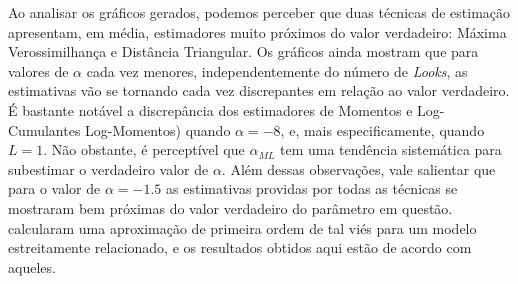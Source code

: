 \documentclass[12pt]{article}
\begin{document}
Ao analisar os gráficos gerados, podemos perceber que duas técnicas de estimação apresentam, em média, estimadores muito próximos do valor verdadeiro: Máxima Verossimilhança e Distância Triangular. Os gráficos ainda mostram que para valores de $\alpha$ cada vez menores, independentemente do número de \textit{Looks}, as estimativas vão se tornando cada vez discrepantes em relação ao valor verdadeiro. É bastante notável a discrepância dos estimadores de Momentos e Log-Cumulantes Log-Momentos) quando $\alpha = -8$, e, mais especificamente, quando $L = 1$. Não obstante, é perceptível que $\alpha_{ML}$ tem uma tendência sistemática para subestimar o verdadeiro valor de $\alpha$. Além dessas observações, vale salientar que para o valor de $\alpha = -1.5$ as estimativas providas por todas as técnicas se mostraram bem próximas do valor verdadeiro do parâmetro em questão. \citet{FreryStochasticDistances2015} calcularam uma aproximação de primeira ordem de tal viés para um modelo estreitamente relacionado, e os resultados obtidos aqui estão de acordo com aqueles.
\end{document}
